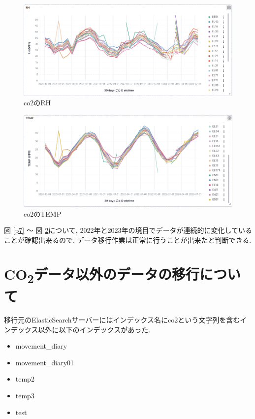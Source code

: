 \begin{figure}[!ht]
    \begin{center}
        \includegraphics[width=160mm]{sotu/figure/rh.png}
        \caption{co2のRH}
        \label{p8}
    \end{center}
\end{figure}

\begin{figure}[!ht]
    \begin{center}
        \includegraphics[width=160mm]{sotu/figure/temp.png}
        \caption{co2のTEMP}
        \label{p9}
    \end{center}
\end{figure}

図 \ref{p7} 〜 図 \ref{p9}について, 2022年と2023年の境目でデータが連続的に変化していることが確認出来るので, データ移行作業は正常に行うことが出来たと判断できる.

\section{CO\textsubscript{2}データ以外のデータの移行について}

移行元のElasticSearchサーバーにはインデックス名にco2という文字列を含むインデックス以外に以下のインデックスがあった.

\begin{itemize}
    \item movement\_diary
    \item movement\_diary01
    \item temp2
    \item temp3
    \item test
\end{itemize}

